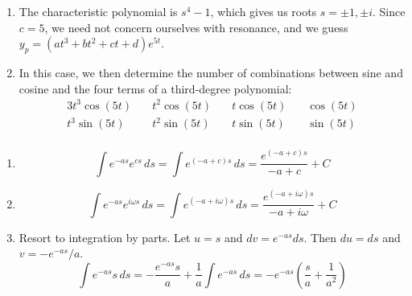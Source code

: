 \documentclass[a4paper]{article}
\begin{document}
\begin{enumerate}[label=(\alph*)]
	\item The characteristic polynomial is \( s^{4} - 1 \), which gives us roots \( s = \pm 1, \pm i  \). Since \( c = 5 \), we need not concern ourselves with resonance, and we guess \( y_{p } = \!\left( at^{3} + bt^{2} + ct + d  \right)e^{5t} \).
	\item In this case, we then determine the number of combinations between sine and cosine and the four terms of a third-degree polynomial:
	\begin{alignat*}{3}
		t^{3}\cos\!\left(5t \right) & \quad t^{2}\cos\!\left(5t \right) & \quad t\cos\!\left(5t \right) & \quad \cos\!\left(5t \right)  \\
		t^{3}\sin\!\left(5t \right) & \quad t^{2}\sin\!\left(5t \right) & \quad t \sin\!\left(5t \right) & \quad \sin\!\left(5t \right)  \\ 
	\end{alignat*}
\end{enumerate}


\begin{enumerate}[label=(\alph*)]
	\item 
	\[
		\int e^{-as }e^{cs } \, ds = \int e^{\!\left( -a + c  \right)s } \, ds = \frac{e^{\!\left( -a + c  \right)s }}{-a + c } + C
	\]
	\item 
	\[
		\int e^{-as }e^{i \omega s } \, ds = \int e^{\!\left( -a + i \omega  \right)s } \, ds = \frac{e^{\!\left( -a + i \omega  \right)s }}{-a + i \omega } + C
	\]
	\item 
	Resort to integration by parts. Let \( u = s  \) and \( dv = e^{-as } ds  \). Then \( du = ds  \) and \( v = -e^{-as } / a \).
	\[
		\int e^{-as }s \, ds = -\frac{e^{-as }s }{a } + \frac{1}{a } \int e^{-as } \, ds = -e^{-as } \!\left( \frac{s }{a } + \frac{1}{a^{2}} \right)
	\]
\end{enumerate}

\vspace{12pt}
\end{document}
